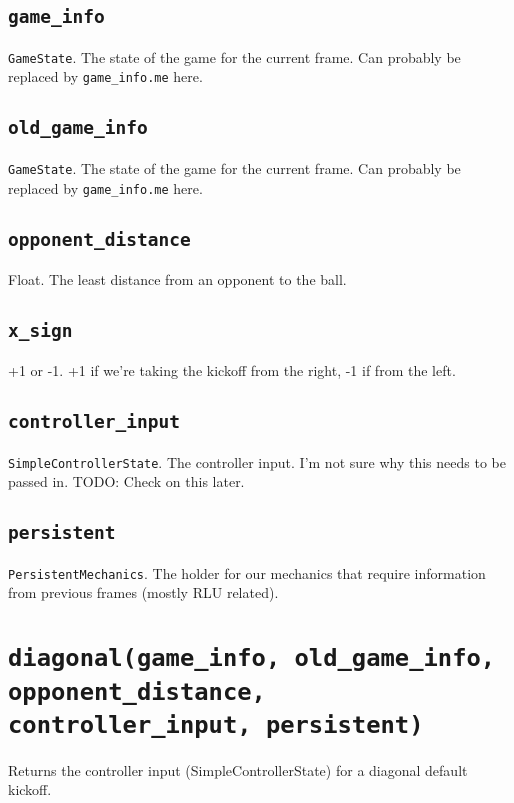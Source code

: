 \documentclass{article}
\newcommand{\function}[1]{\section{\texttt{#1}}}
\newcommand{\argumenta}[1]{\subsection{\texttt{#1}}}
\begin{document}
\begin{flushleft}
{           \argumenta{game\_info}
                     {
                       \texttt{GameState}.  The state of the game for the current frame.  Can probably be replaced by \texttt{game\_info.me} here.
                     }
           \argumenta{old\_game\_info}
                     {
                       \texttt{GameState}.  The state of the game for the current frame.  Can probably be replaced by \texttt{game\_info.me} here.
                     }
           \argumenta{opponent\_distance}
                     {
                       Float.  The least distance from an opponent to the ball.
                     }
           \argumenta{x\_sign}
                     {
                       +1 or -1.  +1 if we're taking the kickoff from the right, -1 if from the left.
                     }
           \argumenta{controller\_input}
                     {
                       \texttt{SimpleControllerState}.  The controller input.  I'm not sure why this needs to be passed in.  TODO: Check on this later.
                     }
           \argumenta{persistent}
                     {
                       \texttt{PersistentMechanics}.  The holder for our mechanics that require information from previous frames (mostly RLU related).
                     }
         }




\function{diagonal(game\_info, old\_game\_info, opponent\_distance, controller\_input, persistent)}
         {
           Returns the controller input (SimpleControllerState) for a diagonal default kickoff.


}
\end{flushleft}
\end{document}
